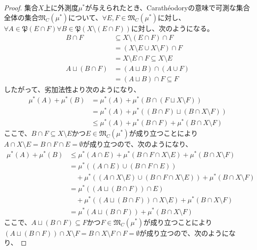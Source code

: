 \documentclass[dvipdfmx]{jsarticle}
\begin{document}
\begin{proof}
集合$X$上に外測度$\mu^{*}$が与えられたとき、Carathéodoryの意味で可測な集合全体の集合$\mathfrak{M}_{C}\left( \mu^{*} \right)$について、$\forall E,F \in \mathfrak{M}_{C}\left( \mu^{*} \right)$に対し、$\forall A \in \mathfrak{P}(E \cap F)\forall B\in \mathfrak{P}\left( X \setminus (E \cap F) \right)$に対し、次のようになる。
\begin{align*}
B \cap F &\subseteq X \setminus (E \cap F) \cap F\\
&= (X \setminus E \cup X \setminus F) \cap F\\
&= X \setminus E \cap F \subseteq X \setminus E\\
A \sqcup (B \cap F) &= (A \sqcup B) \cap (A \cup F)\\
&= (A \sqcup B) \cap F \subseteq F
\end{align*}
したがって、劣加法性より次のようになり、
\begin{align*}
\mu^{*}(A) + \mu^{*}(B) &= \mu^{*}(A) + \mu^{*}\left( B \cap (F \sqcup X \setminus F) \right)\\
&= \mu^{*}(A) + \mu^{*}\left( (B \cap F) \sqcup (B \cap X \setminus F) \right)\\
&\leq \mu^{*}(A) + \mu^{*}(B \cap F) + \mu^{*}(B \cap X \setminus F)
\end{align*}
ここで、$B \cap F \subseteq X \setminus E$かつ$E \in \mathfrak{M}_{C}\left( \mu^{*} \right)$が成り立つことにより$A \cap X \setminus E = B \cap F \cap E = \emptyset$が成り立つので、次のようになり、
\begin{align*}
\mu^{*}(A) + \mu^{*}(B) &\leq \mu^{*}(A \cap E) + \mu^{*}(B \cap F \cap X \setminus E) + \mu^{*}(B \cap X \setminus F)\\
&= \mu^{*}\left( (A \cap E) \cup (B \cap F \cap E) \right) \\
&\quad + \mu^{*}\left( (A \cap X \setminus E) \cup (B \cap F \cap X \setminus E) \right) + \mu^{*}(B \cap X \setminus F)\\
&= \mu^{*}\left( \left( A \sqcup (B \cap F) \right) \cap E \right) \\
&\quad + \mu^{*}\left( \left( A \sqcup (B \cap F) \right) \cap X \setminus E \right) + \mu^{*}(B \cap X \setminus F)\\
&= \mu^{*}\left( A \sqcup (B \cap F) \right) + \mu^{*}(B \cap X \setminus F)
\end{align*}
ここで、$A \sqcup (B \cap F) \subseteq F$かつ$F \in \mathfrak{M}_{C}\left( \mu^{*} \right)$が成り立つことにより$\left( A \sqcup (B \cap F) \right) \cap X \setminus F = B \cap X \setminus F \cap F = \emptyset$が成り立つので、次のようになり、

\end{proof}
\end{document}
